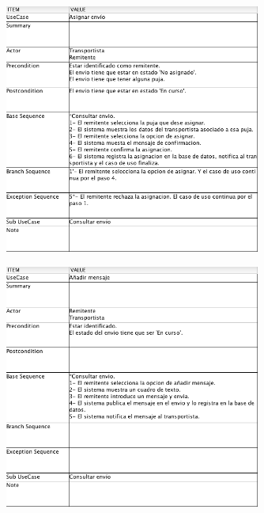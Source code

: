 \documentclass[10pt, a4paper,spanish]{article}
\begin{document}
		\begin{figure}[H]
			\centering
				\includegraphics[width=0.75\textwidth]{astah/use_case_asignar_envio.png}
		\end{figure}

		\begin{figure}[H]
			\centering
				\includegraphics[width=0.75\textwidth]{astah/use_case_anadir_mensaje.png}
		\end{figure}
\end{document}
